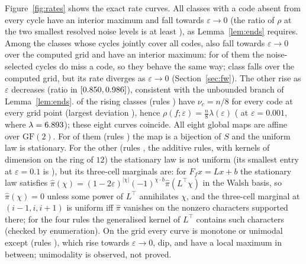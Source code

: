 \documentclass[11pt,a4paper]{article}
\theoremstyle{remark}
\newcommand{\eps}{\varepsilon}
\begin{document}
Figure~\ref{fig:rates} shows the exact rate curves. All \NumClassesBproved{} classes with a code absent from every cycle have an interior maximum and fall towards $\eps\to0$ (the ratio of $\rho$ at the two smallest resolved noise levels is at least \FallingBTrendMin), as Lemma~\ref{lem:ends} requires. Among the \NumClassesUndet{} classes whose cycles jointly cover all codes, \NumFallingU{} also fall towards $\eps\to0$ over the computed grid and have an interior maximum: for \NumUfallingVtwo{} of them the noise-selected cycles do miss a code, so they behave the same way; class \FlipRules{} falls over the computed grid, but its rate diverges as $\eps\to0$ (Section~\ref{sec:fw}). The other \NumRisingU{} rise as $\eps$ decreases (ratio in $[0.850,0.986]$), consistent with the unbounded branch of Lemma~\ref{lem:ends}. \NumUniformMarginal{} of the rising classes (rules \UniformMarginalRules) have $\nu_c=n/8$ for every code at every grid point (largest deviation \UniformMarginalMaxDev), hence $\rho(f;\eps)=\tfrac n8\lambda(\eps)$ (\UniformMarginalRhoSmall{} at $\eps=0.001$, where $\lambda=6.893$); these eight curves coincide. All eight global maps are affine over $\mathrm{GF}(2)$. For \NumBijective{} of them (rules \BijectiveRules) the map is a bijection of $S$ and the uniform law is stationary. For the other \NumAffineNonBij{} (rules \AffineNonBijRules, the additive rules, with kernels of dimension \AffineKernelDims{} on the ring of $12$) the stationary law is not uniform (its smallest entry at $\eps=0.1$ is \AffineMinPi), but its three-cell marginals are: for $F_fx=Lx+b$ the stationary law satisfies $\hat\pi(\chi)=(1-2\eps)^{|\chi|}(-1)^{\chi\cdot b}\hat\pi(L^{\!\top}\chi)$ in the Walsh basis, so $\hat\pi(\chi)=0$ unless some power of $L^{\!\top}$ annihilates $\chi$, and the three-cell marginal at $(i-1,i,i+1)$ is uniform iff $\hat\pi$ vanishes on the nonzero characters supported there; for the four rules the generalised kernel of $L^{\!\top}$ contains \AffineBadCharacters{} such characters (checked by enumeration). On the grid every curve is monotone or unimodal except \NumSignChangesGtOne{} (rules \SignChangesGtOneRules), which rise towards $\eps\to0$, dip, and have a local maximum in between; unimodality is observed, not proved.
\end{document}
